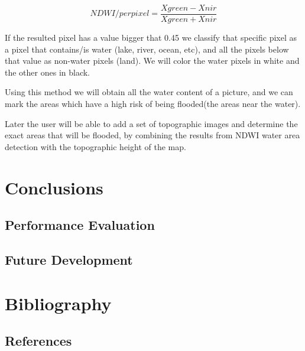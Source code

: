 \documentclass[12pt, a4paper]{report}
\begin{document}
$$ NDWI/perpixel = \frac{Xgreen - Xnir}{Xgreen + Xnir}$$

If the resulted pixel has a value bigger that 0.45 we classify that specific pixel as a pixel that contains/is water (lake, river, ocean, etc), and all the pixels below that value as non-water pixels (land). We will color the water pixels in white and the other ones in black. \par 

Using this method we will obtain all the water content of a picture, and we can mark the areas which have a high risk of being flooded(the areas near the water). \par 

Later the user will be able to add a set of topographic images and determine the exact areas that will be flooded, by combining the results from NDWI water area detection with the topographic height of the map.




\newpage{}

\chapter{Conclusions}


\section{Performance Evaluation} 


\section{Future Development}

\newpage{}

\chapter{Bibliography} 

\section{References}
\end{document}
